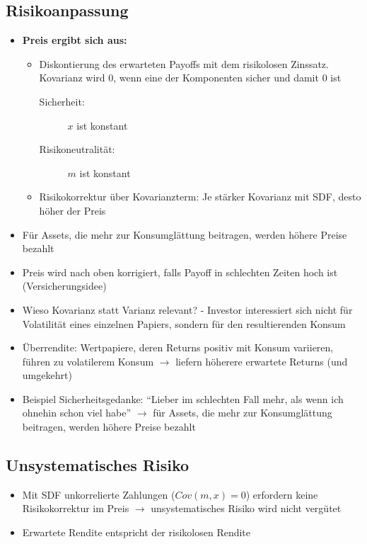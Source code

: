 \subsection{Risikoanpassung}
\begin{itemize}
	\item \textbf{Preis ergibt sich aus:}
	\begin{itemize}
		\item Diskontierung des erwarteten Payoffs mit dem risikolosen Zinssatz. Kovarianz wird \(0\), wenn eine der Komponenten sicher und damit \(0\) ist
		\begin{description}
			\item[Sicherheit:] \(x\) ist konstant
			\item[Risikoneutralität:] \(m\) ist konstant
		\end{description}
		\item Risikokorrektur über Kovarianzterm: Je stärker Kovarianz mit SDF, desto höher der Preis
	\end{itemize}
	\item Für Assets, die mehr zur Konsumglättung beitragen, werden höhere Preise bezahlt
	\item Preis wird nach oben korrigiert, falls Payoff in schlechten Zeiten hoch ist (Versicherungsidee)
	\item Wieso Kovarianz statt Varianz relevant? - Investor interessiert sich nicht für Volatilität eines einzelnen Papiers, sondern für den resultierenden Konsum
	\item Überrendite: Wertpapiere, deren Returns positiv mit Konsum variieren, führen zu volatilerem Konsum \(\rightarrow\) liefern höherere erwartete Returns (und umgekehrt)
	\item Beispiel Sicherheitsgedanke: "`Lieber im schlechten Fall mehr, als wenn ich ohnehin schon viel habe"' \(\rightarrow\) für Assets, die mehr zur Konsumglättung beitragen, werden höhere Preise bezahlt
\end{itemize}


\subsection{Unsystematisches Risiko}
\begin{itemize}
	\item Mit SDF unkorrelierte Zahlungen (\(Cov(m,x)=0\)) erfordern keine Risikokorrektur im Preis \(\rightarrow\) unsystematisches Risiko wird nicht vergütet
	\item Erwartete Rendite entspricht der risikolosen Rendite
\end{itemize}


